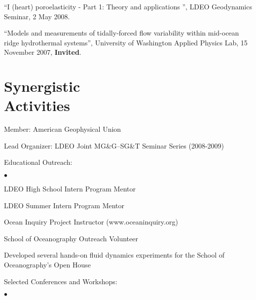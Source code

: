\documentclass[11pt]{res}
\newenvironment{list2}{
  \begin{list}{$\bullet$}{%
      \setlength{\itemsep}{0in}
      \setlength{\parsep}{0in} \setlength{\parskip}{0in}
      \setlength{\topsep}{0in} \setlength{\partopsep}{0in} 
      \setlength{\leftmargin}{0.2in}}}{\end{list}}
\begin{document}
\begin{resume}
``I (heart) poroelasticity - Part 1: Theory and applications '', LDEO Geodynamics Seminar, 2 May 2008.

``Models and measurements of tidally-forced flow variability within mid-ocean ridge hydrothermal systems'', University of Washington Applied Physics Lab, 15 November 2007, {\bf Invited}.

\section{\sc Synergistic\\Activities}
Member: American Geophysical Union

Lead Organizer: LDEO Joint MG\&G--SG\&T Seminar Series (2008-2009)

Educational Outreach:
\begin{list2}
\item LDEO High School Intern Program Mentor
\item LDEO Summer Intern Program Mentor
\item Ocean Inquiry Project Instructor (www.oceaninquiry.org)
\item School of Oceanography Outreach Volunteer
\item Developed several hands-on fluid dynamics experiments for the School of Oceanography's Open House 
\end{list2}
Selected Conferences and Workshops: 
\begin{list2}


\end{list2}
\end{resume}
\end{document}

